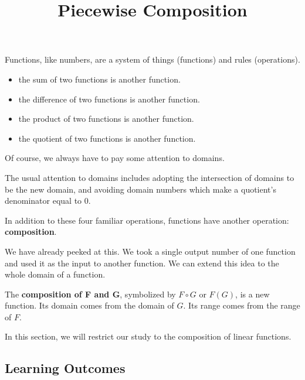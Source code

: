 \documentclass{ximera}
\title{Piecewise Composition}
\begin{document}
\begin{abstract}
\end{abstract}
\maketitle




Functions, like numbers, are a system of things (functions) and rules (operations).  

\begin{itemize}
\item the sum of two functions is another function.
\item the difference of two functions is another function.
\item the product of two functions is another function.
\item the quotient of two functions is another function.
\end{itemize}

Of course, we always have to pay some attention to domains.



The usual attention to domains includes adopting the intersection of domains to be the new domain, and avoiding domain numbers which make a quotient's denominator equal to $0$.



In addition to these four familiar operations, functions have another operation: \textbf{\textcolor{purple!85!blue}{composition}}.

We have already peeked at this. We took a single output number of one function and used it as the input to another function.  We can extend this idea to the whole domain of a function.


The \textbf{\textcolor{purple!85!blue}{composition of F and G}}, symbolized by $F \circ G$ or $F(G)$, is a new function.  Its domain comes from the domain of $G$. Its range comes from the range of $F$.



In this section, we will restrict our study to the composition of linear functions.














\subsection*{Learning Outcomes}
\end{document}
